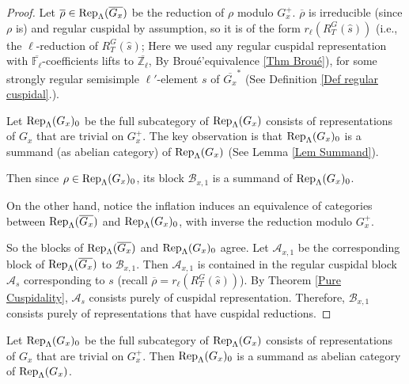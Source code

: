 	\begin{proof}
		Let $\overline{\rho} \in \operatorname{\operatorname{Rep}}_{\Lambda}(\overline{G_x})$ be the reduction of $\rho$ modulo $G_x^+$. $\overline{\rho}$ is irreducible (since $\rho$ is) and regular cuspidal by assumption, so it is of the form $r_{\ell}(R_T^G(\hat{s}))$ (i.e., the $\ell$-reduction of $R_T^G(\hat{s})$; Here we used any regular cuspidal representation with $\overline{\mathbb{F}_{\ell}}$-coefficients lifts to $\overline{\mathbb{Z}_{\ell}}$, By Broué'equivalence \ref{Thm Broué}), for some strongly regular semisimple $\ell'$-element $s$ of $\overline{G_x}^*$ (See Definition \ref{Def regular cuspidal}.). 
		
		Let $\operatorname{\operatorname{Rep}}_{\Lambda}(G_x)_0$ be the full subcategory of $\operatorname{\operatorname{Rep}}_{\Lambda}(G_x)$ consists of representations of $G_x$ that are trivial on $G_x^+$. The key observation is that $\operatorname{\operatorname{Rep}}_{\Lambda}(G_x)_0$ is a summand (as abelian category) of $\operatorname{\operatorname{Rep}}_{\Lambda}(G_x)$ (See Lemma \ref{Lem Summand}).
		
		Then since $\rho \in \operatorname{\operatorname{Rep}}_{\Lambda}(G_x)_0$, its block $\mathcal{B}_{x,1}$ is a summand of $\operatorname{\operatorname{Rep}}_{\Lambda}(G_x)_0$.
		
		On the other hand, notice the inflation induces an equivalence of categories between $\operatorname{\operatorname{Rep}}_{\Lambda}(\overline{G_x})$ and $\operatorname{\operatorname{Rep}}_{\Lambda}(G_x)_0$, with inverse the reduction modulo $G_x^+$.
		
		So the blocks of $\operatorname{\operatorname{Rep}}_{\Lambda}(\overline{G_x})$ and $\operatorname{\operatorname{Rep}}_{\Lambda}(G_x)_0$ agree. Let $\mathcal{A}_{x,1}$ be the corresponding block of $\operatorname{\operatorname{Rep}}_{\Lambda}(\overline{G_x})$ to $\mathcal{B}_{x,1}$. Then $\mathcal{A}_{x,1}$ is contained in the regular cuspidal block $\mathcal{A}_s$ corresponding to $s$ (recall $\overline{\rho}=r_{\ell}(R_T^G(\hat{s}))$). By Theorem \ref{Pure Cuspidality}, $\mathcal{A}_s$ consists purely of cuspidal representation. Therefore, $\mathcal{B}_{x,1}$ consists purely of representations that have cuspidal reductions. 
	\end{proof}
	
	\begin{lemma}\label{Lem Summand}
		Let $\operatorname{\operatorname{Rep}}_{\Lambda}(G_x)_0$ be the full subcategory of $\operatorname{\operatorname{Rep}}_{\Lambda}(G_x)$ consists of representations of $G_x$ that are trivial on $G_x^+$. Then $\operatorname{\operatorname{Rep}}_{\Lambda}(G_x)_0$ is a summand as abelian category of $\operatorname{\operatorname{Rep}}_{\Lambda}(G_x)$.
	\end{lemma}
	
